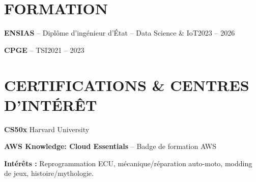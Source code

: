 \documentclass[11pt,a4paper]{article}
\newcommand{\entry}[2]{\noindent #1\hfill #2\par}
\begin{document}
\section*{FORMATION}
\entry{\textbf{ENSIAS} -- Diplôme d'ingénieur d'État -- Data Science \& IoT}{2023 -- 2026}
\vspace{3pt}
\entry{\textbf{CPGE} -- TSI}{2021 -- 2023}

\section*{CERTIFICATIONS \& CENTRES D'INTÉRÊT}
\textbf{CS50x} \textbar{} Harvard University\par
\vspace{3pt}
\textbf{AWS Knowledge: Cloud Essentials} -- Badge de formation \textbar{} AWS\par

\vspace{5pt}
\textbf{Intérêts :} Reprogrammation ECU, mécanique/réparation auto-moto, modding de jeux, histoire/mythologie.
\end{document}
